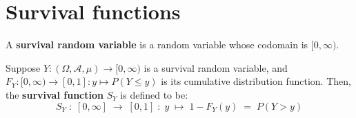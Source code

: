 

\section{Survival functions}
\setcounter{theorem}{0}
\setcounter{equation}{0}

\renewcommand{\theenumi}{\roman{enumi}}
\renewcommand{\labelenumi}{\textnormal{(\theenumi)}$\;\;$}


\begin{definition}
\mbox{}
\vskip 0.1cm
\noindent
A \textbf{survival random variable} is a random variable whose codomain is $[0,\infty)$.
\end{definition}

\vskip 0.5cm
\begin{definition}
\mbox{}
\vskip 0.1cm
\noindent
Suppose $Y : (\Omega,\mathcal{A},\mu) \longrightarrow [0,\infty)$ is a survival random variable,
and $F_{Y} : [0,\infty) \longrightarrow [0,1] : y \longmapsto P(Y \leq y)$ is its cumulative distribution function.
Then, the \textbf{survival function} $S_{Y}$ is defined to be:
\begin{equation*}
S_{Y} \;:\; [0,\infty] \;\longrightarrow\; [0,1] \;:\; y \;\longmapsto\; 1 - F_{Y}(y) \;=\; P(Y > y)
\end{equation*}
\end{definition}


